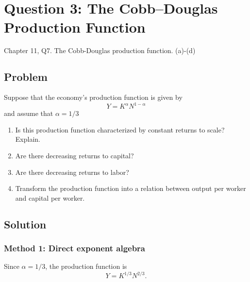 \documentclass[12pt]{article}
\begin{document}
\section{Question 3: The Cobb--Douglas Production Function}

\noindent
Chapter 11, Q7. The Cobb-Douglas production function. (a)-(d)

\subsection{Problem}
Suppose that the economy’s production function is given by
\[
Y=K^\alpha N^{1-\alpha}
\]
and assume that \(\alpha=1/3\)

\begin{enumerate}[label=(\alph*)]
    \item Is this production function characterized by constant returns to scale? Explain.
    \item Are there decreasing returns to capital?
    \item Are there decreasing returns to labor?
    \item Transform the production function into a relation between output per worker and capital per worker.
\end{enumerate}

\subsection{Solution}

\subsubsection{Method 1: Direct exponent algebra}
Since \(\alpha=1/3\), the production function is
\[
Y=K^{1/3}N^{2/3}.
\]
\end{document}
